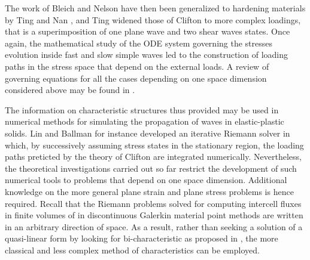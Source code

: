 The work of Bleich and Nelson have then been generalized to hardening materials by Ting and Nan \cite{Ting68}, and Ting \cite{Ting69} widened those of Clifton to more complex loadings, that is a superimposition of one plane wave and two shear waves states.
Once again, the mathematical study of the ODE system governing the stresses evolution inside fast and slow simple waves led to the construction of loading paths in the stress space that depend on the external loads. A review of governing equations for all the cases depending on one space dimension considered above may be found in \cite{Nowacki}.

The information on characteristic structures thus provided may be used in numerical methods for simulating the propagation of waves in elastic-plastic solids. 
Lin and Ballman for instance \cite{Lin_et_Ballman} developed an iterative Riemann solver in which, by successively assuming stress states in the stationary region, the loading paths preticted by the theory of Clifton \cite{Clifton} are integrated numerically.
Nevertheless, the theoretical investigations carried out so far restrict the development of such numerical tools to problems that depend on one space dimension.
Additional knowledge on the more general plane strain and plane stress problems is hence required.
Recall that the Riemann problems solved for computing intercell fluxes in finite volumes of in discontinuous Galerkin material point methods are written in an arbitrary direction of space.
As a result, rather than seeking a solution of a quasi-linear form by looking for bi-characteristic as proposed in \cite{Clifton_thesis}, the more classical and less complex method of characteristics can be employed.





